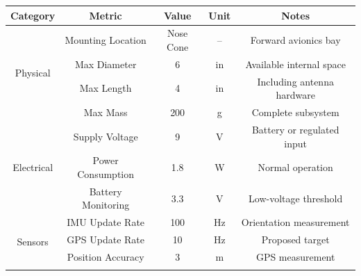 
\begin{table}[H]
    \centering
    \begin{tabular}{ccccc}
    \toprule
    \textbf{Category} & \textbf{Metric} & \textbf{Value} & \textbf{Unit} & \textbf{Notes} \\ 
    \midrule


    \multirow{4}{*}{Physical}
        & Mounting Location
        & Nose Cone
        & --
        & Forward avionics bay \\
    \cmidrule(lr){2-5}

        & Max Diameter
        & 6
        & \unit{in}
        & Available internal space \\
    \cmidrule(lr){2-5}

        & Max Length
        & 4
        & \unit{in}
        & Including antenna hardware \\
    \cmidrule(lr){2-5}

        & Max Mass
        & 200
        & \unit{g}
        & Complete subsystem \\
    \midrule


    \multirow{3}{*}{Electrical}
        & Supply Voltage
        & 9
        & \unit{\volt}
        & Battery or regulated input \\
    \cmidrule(lr){2-5}

        & Power Consumption
        & 1.8
        & \unit{\watt}
        & Normal operation \\
    \cmidrule(lr){2-5}

        & Battery Monitoring
        & 3.3
        & \unit{\volt}
        & Low-voltage threshold \\
    \midrule


    \multirow{4}{*}{Sensors}
        & IMU Update Rate
        & 100
        & \unit{\hertz}
        & Orientation measurement \\
    \cmidrule(lr){2-5}

        & GPS Update Rate
        & 10
        & \unit{\hertz}
        & Proposed target \\
    \cmidrule(lr){2-5}

        & Position Accuracy
        & 3
        & \unit{\meter}
        & GPS measurement \\
    \cmidrule(lr){2-5}


\end{tabular}
\end{table}
